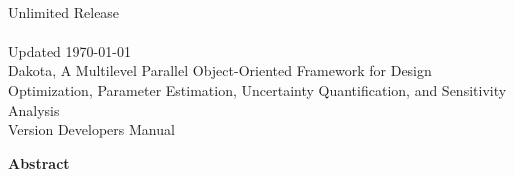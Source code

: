 \documentclass[letterpaper]{book}
\begin{document}
\begin{titlepage}
\setcounter{page}{3}
\begin{center}
{\large \DakotaSANDDev}\\
{\large Unlimited Release}\\
{\large \DakotaSANDDate}\\
{\large Updated \today}\\

\vspace*{1.5cm}
{\LARGE Dakota, A Multilevel Parallel Object-Oriented Framework for 
Design Optimization, Parameter Estimation, Uncertainty Quantification, 
and Sensitivity Analysis}\\
\vspace*{1cm}
{\LARGE Version \DakotaVersion\space Developers Manual}\\
\vspace*{1cm}

\DakotaAuthorFormatted

\pagebreak

{\Large \bf Abstract}
\end{center}

\DakotaAbstractShared
\DakotaAbstractDev

\end{titlepage}

\cleardoublepage
\tableofcontents
\cleardoublepage
%   
\end{document}
